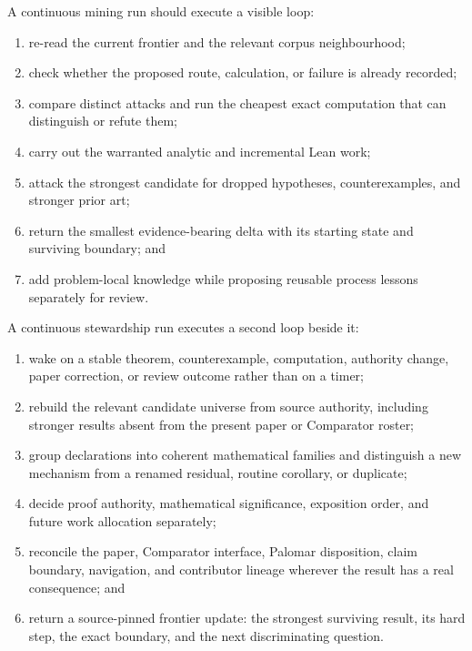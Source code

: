 \documentclass[10pt]{article}
\begin{document}
A continuous mining run should execute a visible loop:

\begin{enumerate}
\item re-read the current frontier and the relevant corpus neighbourhood;
\item check whether the proposed route, calculation, or failure is already
      recorded;
\item compare distinct attacks and run the cheapest exact computation that can
      distinguish or refute them;
\item carry out the warranted analytic and incremental Lean work;
\item attack the strongest candidate for dropped hypotheses, counterexamples,
      and stronger prior art;
\item return the smallest evidence-bearing delta with its starting state and
      surviving boundary; and
\item add problem-local knowledge while proposing reusable process lessons
      separately for review.
\end{enumerate}

A continuous stewardship run executes a second loop beside it:

\begin{enumerate}
\item wake on a stable theorem, counterexample, computation, authority change,
      paper correction, or review outcome rather than on a timer;
\item rebuild the relevant candidate universe from source authority, including
      stronger results absent from the present paper or Comparator roster;
\item group declarations into coherent mathematical families and distinguish
      a new mechanism from a renamed residual, routine corollary, or duplicate;
\item decide proof authority, mathematical significance, exposition order,
      and future work allocation separately;
\item reconcile the paper, Comparator interface, Palomar disposition, claim
      boundary, navigation, and contributor lineage wherever the result has a
      real consequence; and
\item return a source-pinned frontier update: the strongest surviving result,
      its hard step, the exact boundary, and the next discriminating question.
\end{enumerate}
\end{document}
